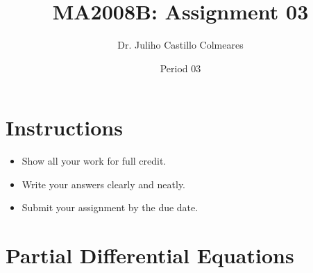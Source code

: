 \documentclass[12pt]{article}
\title{MA2008B: Assignment 03}
\author{Dr. Juliho Castillo Colmeares}
\date{Period 03}
\begin{document}
\maketitle

\section*{Instructions}
\begin{itemize}
    \item Show all your work for full credit.
    \item Write your answers clearly and neatly.
    \item Submit your assignment by the due date.
\end{itemize}

\section{Partial Differential Equations}
\end{document}
